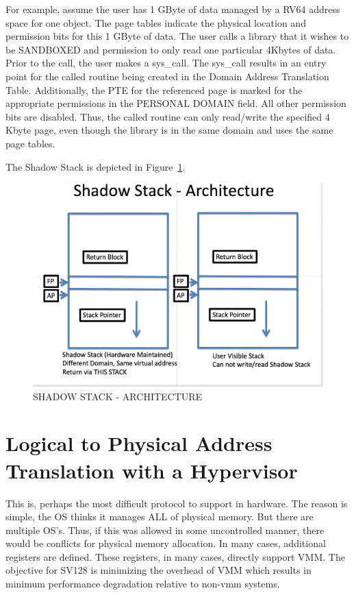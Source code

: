 \documentclass{article}
\begin{document}
For example,  assume the user has 1 GByte of data managed by a RV64 address space for one object.   The page tables indicate the physical location and permission bits for this 1 GByte of data.  The user calls a library that it wishes to be SANDBOXED and permission to only read one particular 4Kbytes of data.   Prior to the call,  the user makes a sys\_call.  The sys\_call results in an entry point for the called routine being created in the Domain Address Translation Table.  Additionally, the PTE for the referenced page is marked for the appropriate permissions in the PERSONAL DOMAIN field. All other permission bits are disabled.  Thus, the called routine can only read/write the specified 4 Kbyte page,  even though the library is in the same domain and uses the same page tables.

The Shadow Stack is depicted in Figure~\ref{fig:shadowstack}.


\begin{figure}
\includegraphics[scale = .4]
{figures/figure6_shadow_stack.jpg}
\caption{SHADOW STACK - ARCHITECTURE\label{fig:shadowstack}}
\end{figure}

\section{Logical to Physical Address Translation with a Hypervisor}


This is, perhaps the most difficult   protocol to support in hardware.  The reason is simple,  the OS thinks it manages ALL of physical memory.  But there  are multiple OS’s.  Thus, if this was allowed in some uncontrolled manner, there would be conflicts for physical memory allocation. In many cases,  additional registers are defined.  These registers, in many cases,  directly support VMM.  The objective for SV128 is minimizing the overhead of VMM which results in minimum performance degradation relative to non-vmm systems.
\end{document}
